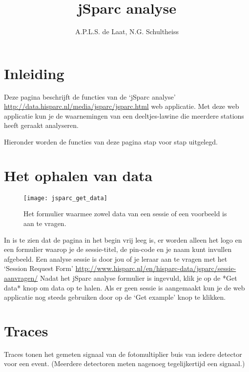 

\title{jSparc analyse}
\author{A.P.L.S. de Laat, N.G. Schultheiss}



\maketitle

\section{Inleiding}

Deze pagina beschrijft de functies van de `jSparc analyse' 
\url{http://data.hisparc.nl/media/jsparc/jsparc.html} web
applicatie. Met deze web applicatie kun je de waarnemingen van een 
deeltjes-lawine die meerdere stations heeft geraakt analyseren.

Hieronder worden de functies van deze pagina stap voor stap uitgelegd.

\section{Het ophalen van data}

\begin{figure}[H]
    \centering
    \texttt{[image: jsparc\_get\_data]}
    \caption{Het formulier waarmee zowel data van een sessie of een voorbeeld is aan te 
   		vragen.}
    \label{fig:get_data}
\end{figure}

In  is te zien dat de pagina in het begin vrij leeg is, er worden alleen het \hisparc logo en een
formulier waarop je de sessie-titel, de pin-code en je naam kunt invullen 
afgebeeld. Een analyse sessie is door jou of je leraar aan te vragen met het 
`Session Request Form'
\url{http://www.hisparc.nl/en/hisparc-data/jsparc/sessie-aanvragen/}
Nadat het jSparc analyse formulier is ingevuld, klik je op de *Get data* knop 
om data op te halen. Als er geen sessie is aangemaakt kun je de web applicatie 
nog steeds gebruiken door op de `Get example' knop te klikken.

\section{Traces}

Traces tonen het gemeten signaal van de fotomultiplier buis van iedere detector
voor een event. (Meerdere detectoren meten nagenoeg tegelijkertijd een 
signaal.)

